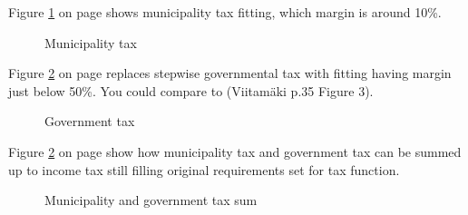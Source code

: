 Figure \ref{fig:muntax} on page \pageref{fig:muntax}
shows municipality tax fitting, which margin is around 10\%. 
\begin{figure} %
 \begin{center}
  \caption{Municipality tax}
  \label{fig:muntax} 
 \end{center}
\end{figure}
Figure \ref{fig:govtax} on page \pageref{fig:govtax}
replaces stepwise governmental tax with fitting having margin just below 50\%.
You could compare to (Viitam\"aki\cite{VM_46_2019} p.35 Figure 3).
\begin{figure} %
 \begin{center}
  \caption{Government tax}
  \label{fig:govtax} 
 \end{center}
\end{figure}
Figure \ref{fig:govtax} on page \pageref{fig:govtax}
show how municipality tax and government tax can be summed up to income tax
still filling original requirements set for tax function.
\begin{figure} %
 \begin{center}
  \caption{Municipality and government tax sum}
  \label{fig:sumtax} 
 \end{center}
\end{figure}

